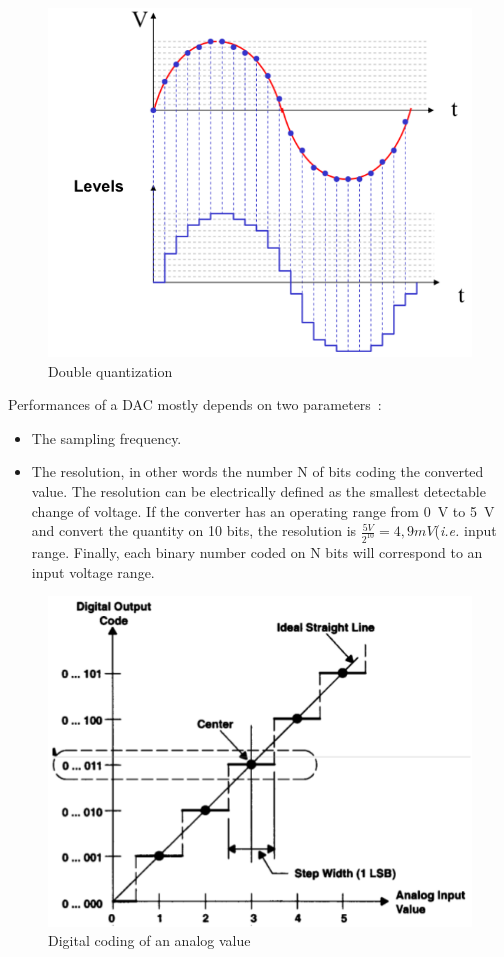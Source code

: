 \documentclass[11pt,a4paper]{article}
\theoremstyle{definition}%
\begin{document}
\begin{figure}[H]
	\centering
	\includegraphics[width=.7\textwidth]{ENdouble-quant}
	\caption{Double quantization}
	\label{fig:double-quant}
\end{figure}

Performances of a DAC mostly depends on two parameters~:
\begin{itemize}
	\item The sampling frequency.
	\item The resolution, in other words the number N of bits coding the converted value.
    The resolution can be electrically defined as the smallest detectable change of voltage.
    If the converter has an operating range from 0~V to 5~V and convert the quantity on 10 bits, the resolution is $\frac{5 V}{2^{10}} = 4,9 mV$(\textit{i.e.} input range.
    Finally, each binary number coded on N bits will correspond to an input voltage range.

\end{itemize}

\begin{figure}
	\centering
	\includegraphics[width=.7\textwidth]{an-dig}
	\caption{Digital coding of an analog value}
	\label{fig:an-dig}
\end{figure}
\end{document}
